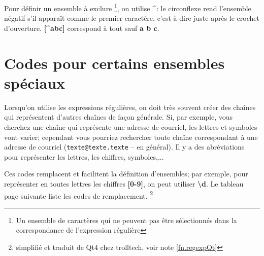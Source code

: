 Pour définir un ensemble à exclure \footnote{Un ensemble de caractères qui ne peuvent pas être sélectionnés dans la correspondance de l'expression régulière}, on utilise \og\textbf{\^{}}\fg: le circonflexe rend l'ensemble négatif s'il apparaît comme le premier caractère, c'est-à-dire juste après le crochet d'ouverture. \textbf{[\^{}abc]} correspond à tout sauf \textbf{a b c}.

\section{Codes pour certains ensembles spéciaux}

Lorsqu'on utilise les expressions régulières, on doit très souvent créer des chaînes qui représentent d'autres chaînes de façon générale. Si, par exemple, vous cherchez une chaîne qui représente une adresse de courriel, les lettres et symboles vont varier; cependant vous pourriez rechercher toute chaîne correspondant à une adresse de courriel (\texttt{texte@texte.texte} -- en général). Il y a des abréviations pour représenter les lettres, les chiffres, symboles,...

Ces codes remplacent et facilitent la définition d'ensembles; par exemple, pour représenter en toutes lettres les chiffres \textbf{[0-9]}, on peut utiliser \og\textbf{\textbackslash{}d}\fg. Le tableau page suivante liste les codes de remplacement. \footnote{simplifié et traduit de Qt4 chez trolltech, voir note \label{trollnext}\ref{fn.regexpQt}}
\smallskip

